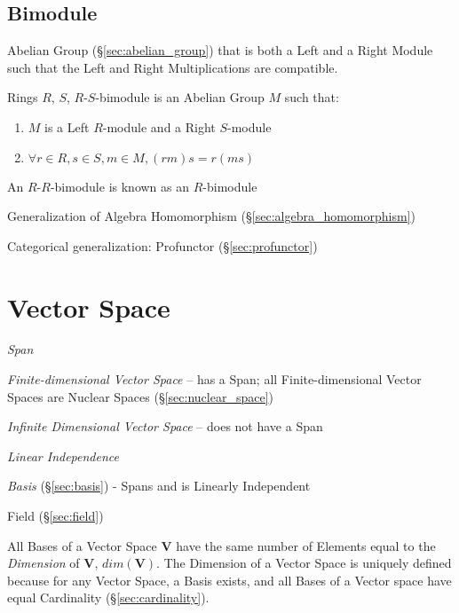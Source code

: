\subsection{Bimodule}\label{sec:bimodule}

Abelian Group (\S\ref{sec:abelian_group}) that is both a Left and a
Right Module such that the Left and Right Multiplications are
compatible.

Rings $R$, $S$, $R$-$S$-bimodule is an Abelian Group $M$ such that:

\begin{enumerate}
\item $M$ is a Left $R$-module and a Right $S$-module
\item $\forall r \in R, s \in S, m \in M, (rm)s = r(ms)$
\end{enumerate}

An $R$-$R$-bimodule is known as an $R$-bimodule

Generalization of Algebra Homomorphism
(\S\ref{sec:algebra_homomorphism})

Categorical generalization: Profunctor (\S\ref{sec:profunctor})



\section{Vector Space}\label{sec:vector_space}

\emph{Span}

\emph{Finite-dimensional Vector Space} -- has a Span; all
Finite-dimensional Vector Spaces are Nuclear Spaces
(\S\ref{sec:nuclear_space})

\emph{Infinite Dimensional Vector Space} -- does not have a Span

\emph{Linear Independence}

\emph{Basis} (\S\ref{sec:basis}) - Spans and is Linearly Independent

Field (\S\ref{sec:field})

All Bases of a Vector Space $\mathbf{V}$ have the same number of
Elements equal to the \emph{Dimension} of $\mathbf{V}$,
$dim(\mathbf{V})$. The Dimension of a Vector Space is uniquely defined
because for any Vector Space, a Basis exists, and all Bases of a
Vector space have equal Cardinality (\S\ref{sec:cardinality}).


